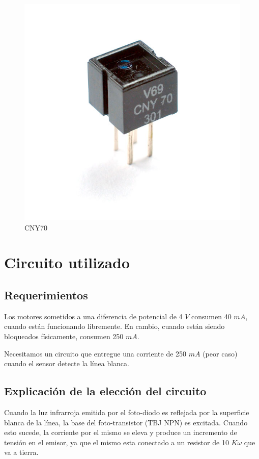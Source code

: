 \documentclass[a4paper]{article}
\begin{document}
\begin{figure}[H]
  \centering
    \includegraphics[width=\textwidth]{./imagenes/cny70.jpg}
  \caption{CNY70}
\end{figure}


\section{Circuito utilizado}


\subsection{Requerimientos}

Los motores sometidos a una diferencia de potencial de 4 $V$ consumen 40 $mA$, cuando están funcionando libremente. 
En cambio, cuando están siendo bloqueados físicamente, consumen 250 $mA$.

Necesitamos un circuito que entregue una corriente de 250 $mA$ (peor caso) cuando el sensor detecte la línea blanca.

\subsection{Explicación de la elección del circuito}

Cuando la luz infrarroja emitida por el foto-diodo es reflejada por la superficie blanca de la línea, la base del foto-transistor (TBJ NPN) es excitada.
Cuando esto sucede, la corriente por el mismo se eleva y produce un incremento de tensión en el emisor, ya que el mismo esta conectado a un resistor de 10 $K\omega$
que va a tierra.\\
\end{document}
